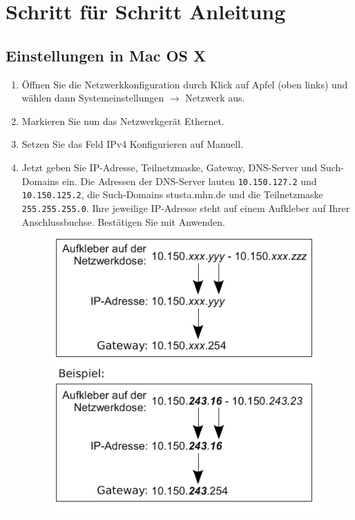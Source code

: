 \documentclass[a4paper,12pt]{scrartcl}
\begin{document}
\section*{Schritt für Schritt Anleitung}
\subsection*{Einstellungen in Mac OS X}
\begin{enumerate}
    \item Öffnen Sie die Netzwerkkonfiguration durch Klick auf Apfel (oben links) und wählen dann Systemeinstellungen $\rightarrow$ Netzwerk aus.
    \item Markieren Sie nun das Netzwerkgerät Ethernet.
    \item Setzen Sie das Feld IPv4 Konfigurieren auf Manuell.
    \item Jetzt geben Sie IP-Adresse, Teilnetzmaske, Gateway, DNS-Server und Such-Domains ein. Die Adressen der DNS-Server lauten \nolinkurl{10.150.127.2} und \nolinkurl{10.150.125.2}, die Such-Domains stusta.mhn.de und die Teilnetzmaske \nolinkurl{255.255.255.0}. Ihre jeweilige IP-Adresse steht auf einem Aufkleber auf Ihrer Anschlussbuchse. Bestätigen Sie mit Anwenden.
      \begin{figure}[h!]
      \centering
        \begin{minipage}[c]{0.38\linewidth}
          \centering
          \includegraphics[width=\linewidth,keepaspectratio]{Bilder/IP_Gerneric}

\end{minipage}
\end{figure}
\end{enumerate}
\end{document}
